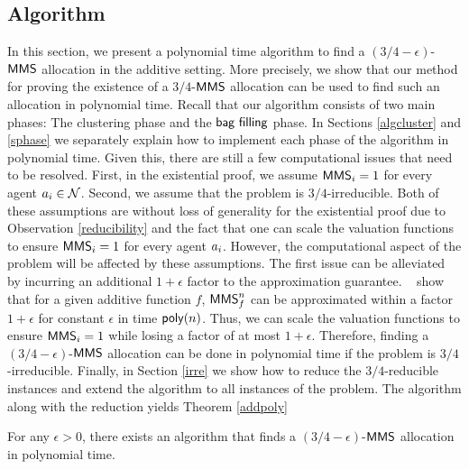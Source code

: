 \subsection{Algorithm}\label{additive:algorithm}
In this section, we present a polynomial time algorithm to find a $(3/4-\epsilon)$-$\mathsf{MMS}$ allocation in the additive setting. More precisely, we show that our method for proving the existence of a $3/4$-$\mathsf{MMS}$ allocation can be used to find such an allocation in polynomial time. 
Recall that our algorithm consists of two main phases: The clustering phase and the $\textsf{bag filling}$ phase. In Sections \ref{algcluster} and \ref{sphase} we separately explain how to implement each phase of the algorithm in polynomial time. Given this, there are still a few computational issues that need to be resolved. First, in the existential proof, we assume $\mathsf{MMS}_i = 1$ for every agent $a_i \in \mathcal{N}$.  Second, we assume that the problem is $3/4$-irreducible. Both of these assumptions are without loss of generality for the existential proof due to Observation \ref{reducibility} and the fact that one can scale the valuation functions to ensure $\mathsf{MMS}_i =1$ for every agent $a_i$. However, the computational aspect of the problem will be affected by these assumptions.  
The first issue can be alleviated by incurring an additional $1+\epsilon$ factor to the approximation guarantee. \epsteinefficient ~\cite{epstein2014efficient} show that for a given additive function $f$, $\mathsf{MMS}_f^n$ can be approximated within a factor $1+\epsilon$ for constant $\epsilon$ in time $\mathsf{poly}(n)$. Thus, we can scale the valuation functions to ensure $\mathsf{MMS}_i = 1$ while losing a factor of at most $1+\epsilon$. Therefore, finding a $(3/4-\epsilon)$-$\mathsf{MMS}$ allocation can be done in polynomial time if the problem is $3/4$-irreducible. Finally, in Section \ref{irre} we show how to reduce the $3/4$-reducible instances and extend the algorithm to all instances of the problem. The algorithm along with the reduction yields Theorem \ref{addpoly}

\begin{theorem}
	\label{addpoly}
	For any $\epsilon > 0$, there exists an algorithm that finds a $(3/4 - \epsilon)$-$\mathsf{MMS}$ allocation in polynomial time. 
\end{theorem}

